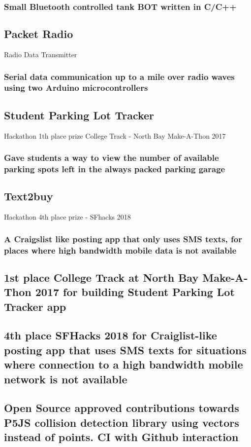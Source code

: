 \documentclass{article}
\begin{document}
		\subsubsection{Small Bluetooth controlled tank BOT written in C/C++}
	\subsection{Packet Radio} Radio Data Transmitter
    	\vspace{-3mm}
		\subsubsection{ Serial data communication up to a mile over radio waves using two Arduino microcontrollers}
	\subsection{Student Parking Lot Tracker} Hackathon 1th place prize College Track - North Bay Make-A-Thon 2017
    	\vspace{-3mm}
		\subsubsection{Gave students a way to view the number of available parking spots left in the always packed parking garage}
		
	\subsection{Text2buy} Hackathon 4th place prize - SFhacks 2018
    	\vspace{-3mm}
		\subsubsection{A Craigslist  like posting app that only uses SMS texts, for places where high bandwidth mobile data is not available}
		
		\subsection{1st place College Track at North Bay Make-A-Thon 2017 for building Student Parking Lot Tracker app}
\subsection{4th place SFHacks 2018 for Craiglist-like posting app that uses SMS texts for situations where connection to a high bandwidth mobile network is not available}
\subsection{Open Source approved contributions towards P5JS collision detection library using vectors instead of points. CI with Github interaction}

		
\end{document}
